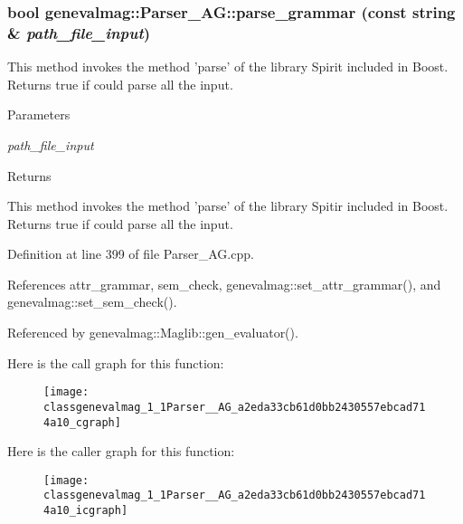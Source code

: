 \hypertarget{classgenevalmag_1_1Parser__AG_a2eda33cb61d0bb2430557ebcad714a10}{
\subsubsection[{parse\_\-grammar}]{\setlength{\rightskip}{0pt plus 5cm}bool genevalmag::Parser\_\-AG::parse\_\-grammar (const string \& {\em path\_\-file\_\-input})}}
\label{classgenevalmag_1_1Parser__AG_a2eda33cb61d0bb2430557ebcad714a10}
This method invokes the method 'parse' of the library Spirit included in Boost. Returns true if could parse all the input. 
\begin{DoxyParams}{Parameters}
\item[{\em path\_\-file\_\-input}]\end{DoxyParams}
\begin{DoxyReturn}{Returns}

\end{DoxyReturn}
This method invokes the method 'parse' of the library Spitir included in Boost. Returns true if could parse all the input. 

Definition at line 399 of file Parser\_\-AG.cpp.



References attr\_\-grammar, sem\_\-check, genevalmag::set\_\-attr\_\-grammar(), and genevalmag::set\_\-sem\_\-check().



Referenced by genevalmag::Maglib::gen\_\-evaluator().



Here is the call graph for this function:\nopagebreak
\begin{figure}[H]
\begin{center}
\leavevmode
\texttt{[image: classgenevalmag\_1\_1Parser\_\_AG\_a2eda33cb61d0bb2430557ebcad714a10\_cgraph]}
\end{center}
\end{figure}




Here is the caller graph for this function:\nopagebreak
\begin{figure}[H]
\begin{center}
\leavevmode
\texttt{[image: classgenevalmag\_1\_1Parser\_\_AG\_a2eda33cb61d0bb2430557ebcad714a10\_icgraph]}
\end{center}
\end{figure}


